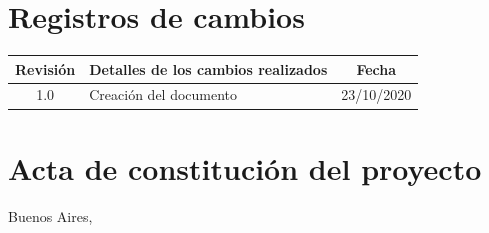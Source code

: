 \documentclass[11pt]{charter}
\begin{document}
\maketitle
\thispagestyle{empty}
\pagebreak


\thispagestyle{empty}
{\setlength{\parskip}{0pt}
\tableofcontents{}
}
\pagebreak


\section{Registros de cambios}
\label{sec:registro}


\begin{table}[ht]
\label{tab:registro}
\centering
\begin{tabularx}{\linewidth}{@{}|c|X|c|@{}}
\hline
\rowcolor[HTML]{C0C0C0} 
Revisión & \multicolumn{1}{c|}{\cellcolor[HTML]{C0C0C0}Detalles de los cambios realizados} & Fecha      \\ \hline
1.0      & Creación del documento                                          & 23/10/2020 \\ \hline
\end{tabularx}
\end{table}

\pagebreak



\section{Acta de constitución del proyecto}
\label{sec:acta}

\begin{flushright}
Buenos Aires, \fechaInicioName
\end{flushright}

\vspace{2cm}
\end{document}

